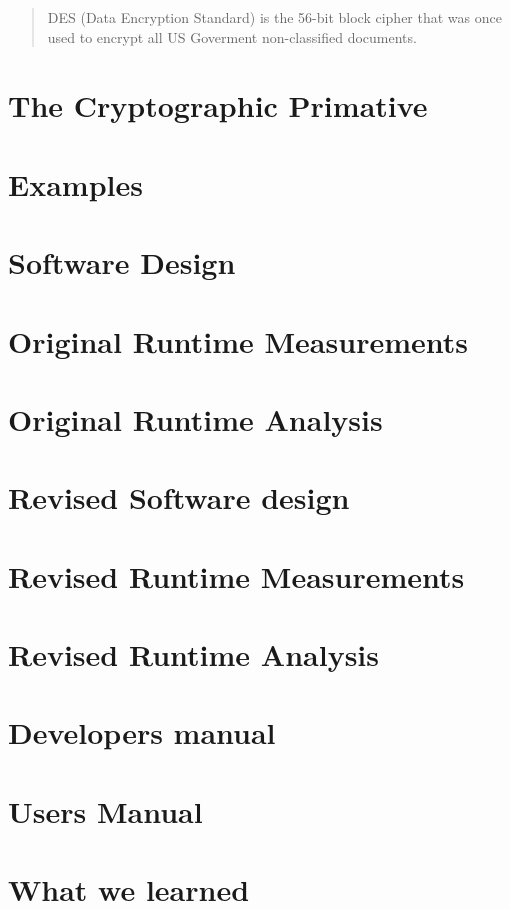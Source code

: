 \documentclass[12pt]{article}
\begin{document}
\maketitle

\begin{abstract}
DES (Data Encryption Standard) is the 56-bit block cipher that was once used to encrypt all US Goverment non-classified documents. 
\end{abstract}

\newpage      
\section{The Cryptographic Primative}

\section{Examples}
\section{Software Design}
\section{Original Runtime Measurements}
\section{Original Runtime Analysis}
\section{Revised Software design}
\section{Revised Runtime Measurements}
\section{Revised Runtime Analysis}
\section{Developers manual}
\section{Users Manual}
\section{ What we learned }
\end{document}
